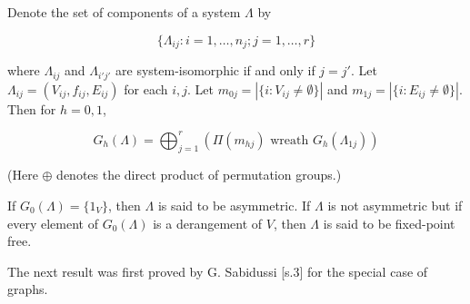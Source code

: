 Denote the set of components of a system $\Lambda$ by

$$\{\Lambda_{ij}: i = 1, \ldots, n_j; j = 1, \ldots, r\}$$

where $\Lambda_{ij}$ and $\Lambda_{i'j'}$ are system-isomorphic if and only if $j = j'$. Let $\Lambda_{ij} = (V_{ij}, f_{ij}, E_{ij})$ for each $i, j$. Let $m_{0j} = |\{i: V_{ij} \neq \emptyset\}|$ and $m_{1j} = |\{i: E_{ij} \neq \emptyset\}|$. Then for $h = 0, 1$,

$$G_h(\Lambda) = \bigoplus_{j=1}^{r} (\Pi(m_{hj}) \text{ wreath } G_h(\Lambda_{1j}))$$

(Here $\oplus$ denotes the direct product of permutation groups.)

If $G_0(\Lambda) = \{1_V\}$, then $\Lambda$ is said to be asymmetric. If $\Lambda$ is not asymmetric but if every element of $G_0(\Lambda)$ is a derangement of $V$, then $\Lambda$ is said to be fixed-point free.

The next result was first proved by G. Sabidussi [s.3] for the special case of graphs.
